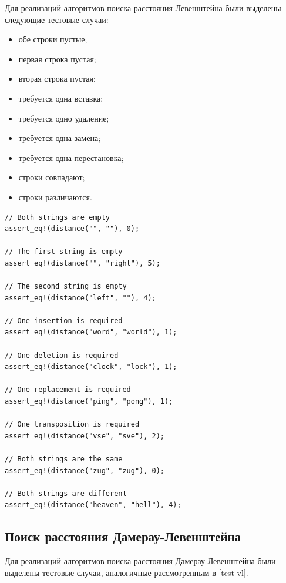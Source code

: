 \documentclass{report}
\begin{document}
Для реализаций алгоритмов поиска расстояния Левенштейна были
выделены следующие тестовые случаи:

\begin{itemize}
    \item обе строки пустые;
    \item первая строка пустая;
    \item вторая строка пустая;
    \item требуется одна вставка;
    \item требуется одно удаление;
    \item требуется одна замена;
    \item требуется одна перестановка;
    \item строки совпадают;
    \item строки различаются.
\end{itemize}

\begin{lstlisting}[caption=Тесты реализаций алгоритмов поиска
    $\Delta_{\textup{Л}}$]
// Both strings are empty
assert_eq!(distance("", ""), 0);

// The first string is empty
assert_eq!(distance("", "right"), 5);

// The second string is empty
assert_eq!(distance("left", ""), 4);

// One insertion is required
assert_eq!(distance("word", "world"), 1);

// One deletion is required
assert_eq!(distance("clock", "lock"), 1);

// One replacement is required
assert_eq!(distance("ping", "pong"), 1);

// One transposition is required
assert_eq!(distance("vse", "sve"), 2);

// Both strings are the same
assert_eq!(distance("zug", "zug"), 0);

// Both strings are different
assert_eq!(distance("heaven", "hell"), 4);
\end{lstlisting}

\subsection{Поиск расстояния Дамерау-Левенштейна}

Для реализаций алгоритмов поиска расстояния Дамерау-Левенштейна
были выделены тестовые случаи, аналогичные рассмотренным в
\ref{test-vl}.
\end{document}

